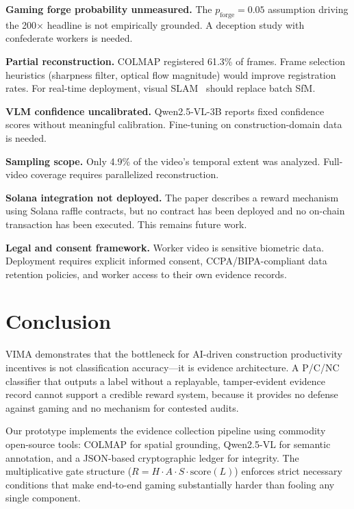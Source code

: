\documentclass[sigconf,nonacm]{acmart}
\begin{document}
\textbf{Gaming forge probability unmeasured.}
The $p_{\mathrm{forge}} = 0.05$ assumption driving the 200$\times$ headline is not empirically grounded.
A deception study with confederate workers is needed.

\textbf{Partial reconstruction.}
COLMAP registered 61.3\% of frames.
Frame selection heuristics (sharpness filter, optical flow magnitude) would improve registration rates.
For real-time deployment, visual SLAM~\cite{orbslam3} should replace batch SfM.

\textbf{VLM confidence uncalibrated.}
Qwen2.5-VL-3B reports fixed confidence scores without meaningful calibration.
Fine-tuning on construction-domain data is needed.

\textbf{Sampling scope.}
Only 4.9\% of the video's temporal extent was analyzed.
Full-video coverage requires parallelized reconstruction.

\textbf{Solana integration not deployed.}
The paper describes a reward mechanism using Solana raffle contracts, but no contract has been deployed and no on-chain transaction has been executed.
This remains future work.

\textbf{Legal and consent framework.}
Worker video is sensitive biometric data.
Deployment requires explicit informed consent, CCPA/BIPA-compliant data retention policies, and worker access to their own evidence records.

\section{Conclusion}
\label{sec:conclusion}

VIMA demonstrates that the bottleneck for AI-driven construction productivity incentives is not classification accuracy---it is evidence architecture.
A P/C/NC classifier that outputs a label without a replayable, tamper-evident evidence record cannot support a credible reward system, because it provides no defense against gaming and no mechanism for contested audits.

Our prototype implements the evidence collection pipeline using commodity open-source tools: COLMAP for spatial grounding, Qwen2.5-VL for semantic annotation, and a JSON-based cryptographic ledger for integrity.
The multiplicative gate structure ($R = H \cdot A \cdot S \cdot \mathrm{score}(L)$) enforces strict necessary conditions that make end-to-end gaming substantially harder than fooling any single component.
\end{document}
